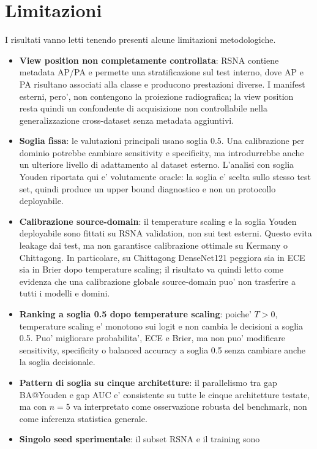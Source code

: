 \documentclass[11pt,a4paper]{article}
\newcommand{\balacc}{balanced accuracy}
\begin{document}
\section{Limitazioni}

I risultati vanno letti tenendo presenti alcune limitazioni metodologiche.

\begin{itemize}
  \item \textbf{View position non completamente controllata}: RSNA contiene
  metadata AP/PA e permette una stratificazione sul test interno, dove AP e PA
  risultano associati alla classe e producono prestazioni diverse. I manifest
  esterni, pero', non contengono la proiezione radiografica; la view position
  resta quindi un confondente di acquisizione non controllabile nella
  generalizzazione cross-dataset senza metadata aggiuntivi.
  \item \textbf{Soglia fissa}: le valutazioni principali usano soglia 0.5. Una
  calibrazione per dominio potrebbe cambiare sensitivity e specificity, ma
  introdurrebbe anche un ulteriore livello di adattamento al dataset esterno.
  L'analisi con soglia Youden riportata qui e' volutamente oracle: la soglia e'
  scelta sullo stesso test set, quindi produce un upper bound diagnostico e non
  un protocollo deployabile.
  \item \textbf{Calibrazione source-domain}: il temperature scaling e la soglia
  Youden deployabile sono fittati su RSNA validation, non sui test esterni. Questo
  evita leakage dai test, ma non garantisce calibrazione ottimale su Kermany o
  Chittagong. In particolare, su Chittagong DenseNet121 peggiora sia in ECE sia
  in Brier dopo temperature scaling; il risultato va quindi letto come evidenza
  che una calibrazione globale source-domain puo' non trasferire a tutti i
  modelli e domini.
  \item \textbf{Ranking a soglia 0.5 dopo temperature scaling}: poiche'
  \(T>0\), temperature scaling e' monotono sui logit e non cambia le decisioni a
  soglia 0.5. Puo' migliorare probabilita', ECE e Brier, ma non puo' modificare
  sensitivity, specificity o \balacc{} a soglia 0.5 senza cambiare anche la
  soglia decisionale.
  \item \textbf{Pattern di soglia su cinque architetture}: il parallelismo tra
  gap BA@Youden e gap AUC e' consistente su tutte le cinque architetture
  testate, ma con \(n=5\) va interpretato come osservazione robusta del
  benchmark, non come inferenza statistica generale.
  \item \textbf{Singolo seed sperimentale}: il subset RSNA e il training sono

\end{itemize}
\end{document}
